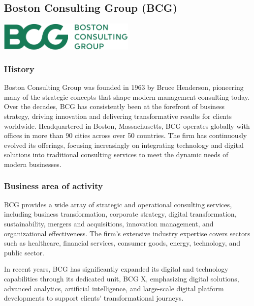 \subsection{Boston Consulting Group (BCG)}
\begin{center}
    \centering
    \includegraphics[width=0.5\textwidth]{Images/Boston-Consulting-Group-Logo.jpg}
     \cite{O-History}
    \label{fig:oracle}
\end{center}

\subsubsection{History}
Boston Consulting Group was founded in 1963 by Bruce Henderson, pioneering many of the strategic concepts that shape modern management consulting today. Over the decades, BCG has consistently been at the forefront of business strategy, driving innovation and delivering transformative results for clients worldwide. Headquartered in Boston, Massachusetts, BCG operates globally with offices in more than 90 cities across over 50 countries. The firm has continuously evolved its offerings, focusing increasingly on integrating technology and digital solutions into traditional consulting services to meet the dynamic needs of modern businesses.

\subsubsection{Business area of activity}
BCG provides a wide array of strategic and operational consulting services, including business transformation, corporate strategy, digital transformation, sustainability, mergers and acquisitions, innovation management, and organizational effectiveness. The firm's extensive industry expertise covers sectors such as healthcare, financial services, consumer goods, energy, technology, and public sector.\mynewline

In recent years, BCG has significantly expanded its digital and technology capabilities through its dedicated unit, BCG X, emphasizing digital solutions, advanced analytics, artificial intelligence, and large-scale digital platform developments to support clients' transformational journeys.

